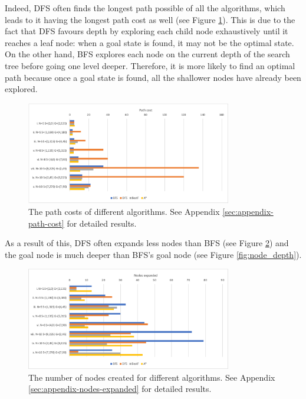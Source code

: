 \documentclass[letterpaper,12pt]{article}
\begin{document}
Indeed, DFS often finds the longest path possible of all the algorithms, which leads to it having the longest path cost as well (see Figure \ref{fig:path_cost}). This is due to the fact that DFS favours depth by exploring each child node exhaustively until it reaches a leaf node: when a goal state is found, it may not be the optimal state. On the other hand, BFS explores each node on the current depth of the search tree before going one level deeper. Therefore, it is more likely to find an optimal path because once a goal state is found, all the shallower nodes have already been explored.

\begin{figure}[ht]
\centering
\includegraphics[width=0.8\textwidth]{report/figures/path_cost.png}
\caption{\label{fig:path_cost}The path costs of different algorithms. See Appendix \ref{sec:appendix-path-cost} for detailed results.}
\end{figure}

As a result of this, DFS often expands less nodes than BFS (see Figure \ref{fig:nodes_expanded}) and the goal node is much deeper than BFS's goal node (see Figure \ref{fig:node_depth}).\\

\begin{figure}[ht]
\centering
\includegraphics[width=0.8\textwidth]{report/figures/nodes_expanded.png}
\caption{\label{fig:nodes_expanded}The number of nodes created for different algorithms. See Appendix \ref{sec:appendix-nodes-expanded} for detailed results.}
\end{figure}
\end{document}
